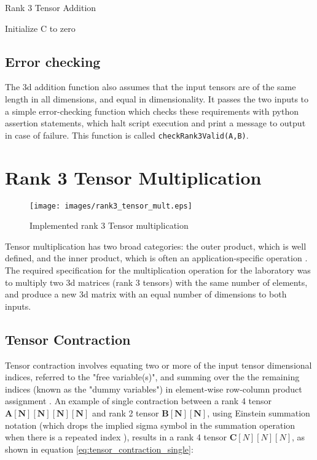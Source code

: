 \documentclass[10 pt, conference]{cssconf}
\begin{document}
\begin{algorithm}[ht] \small
\caption{Rank 3 Tensor Addition}\label{pc:rank3_add}
    	 \SetAlgoLined
	Initialize C to zero\;
\end{algorithm} %

\subsection{Error checking}
The 3d addition function also assumes that the input tensors are of the same length in all dimensions, and equal in dimensionality. It passes the two inputs to a simple error-checking function which checks these requirements with python assertion statements, which halt script execution and print a message to output in case of failure. This function is called \verb|checkRank3Valid(A,B)|.
\section{Rank 3 Tensor Multiplication}

\begin{figure}[ht] \centering 
    \vspace*{-5pt}
    \small{\texttt{[image: images/rank3\_tensor\_mult.eps]}}
    \small\caption{Implemented rank 3 Tensor multiplication}
    \label{fig:tensor_product} 
\end{figure}%

Tensor multiplication has two broad categories: the outer product, which is well defined, and the inner product, which  is often an application-specific operation \cite{sringeri2015tensor}. The required specification for the multiplication operation for the laboratory was to multiply two 3d matrices (rank 3 tensors) with the same number of elements, and produce a new 3d matrix with an equal number of dimensions to both inputs.

\subsection{Tensor Contraction}
Tensor contraction involves equating two or more of the input tensor dimensional indices, referred to the "free variable(s)", and summing over the the remaining indices (known as the "dummy variables") in element-wise row-column product assignment \cite{hackbusch2012tensor}. An example of single contraction between a rank 4 tensor $\mathbf{A[N][N][N][N]}$ and rank 2 tensor $\mathbf{B[N][N]}$, using Einstein summation notation (which drops the implied sigma symbol in the summation operation when there is a repeated index \cite{Hunt-notes}), results in a rank 4 tensor $\mathbf{C}[N][N][N]$, as shown in equation \ref{eq:tensor_contraction_single}:
\end{document}
